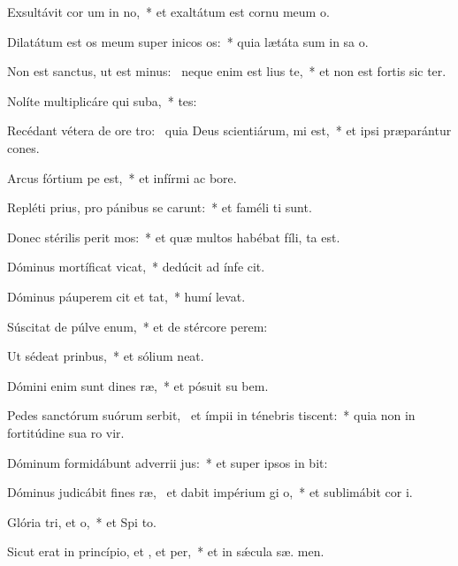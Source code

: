 \item Exsultávit cor um in no,~* et exaltátum est cornu meum   o.
\item Dilatátum est os meum super inicos os:~* quia lætáta sum in sa o.
\item Non est sanctus, ut est minus:~\pscross{} neque enim est lius  te,~* et non est fortis sic  ter.
\item Nolíte multiplicáre qui suba,~* tes:
\item Recédant vétera de ore tro:~\pscross{} quia Deus scientiárum, mi est,~* et ipsi præparántur cones.
\item Arcus fórtium pe est,~* et infírmi ac  bore.
\item Repléti prius, pro pánibus se carunt:~* et faméli ti sunt.
\item Donec stérilis perit mos:~* et quæ multos habébat fíli, ta est.
\item Dóminus mortíficat  vicat,~* dedúcit ad ínfe  cit.
\item Dóminus páuperem cit et tat,~* humí  levat.
\item Súscitat de púlve enum,~* et de stércore  perem:
\item Ut sédeat  prinbus,~* et sólium  neat.
\item Dómini enim sunt dines ræ,~* et pósuit su  bem.
\item Pedes sanctórum suórum serbit,~\pscross{} et ímpii in ténebris tiscent:~* quia non in fortitúdine sua ro vir.
\item Dóminum formidábunt adverrii jus:~* et super ipsos in  bit:
\item Dóminus judicábit fines ræ,~\pscross{} et dabit impérium gi o,~* et sublimábit cor  i.
\item Glória tri, et o,~* et Spi to.
\item Sicut erat in princípio, et , et per,~* et in sǽcula sæ. men.
